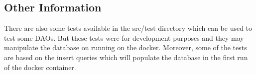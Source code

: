 \subsection{Other Information}


There are also some tests available in the src/test directory which can be used to test some DAOs.
But these tests were for development purposes and they may manipulate the database on running on the docker.
Moreover, some of the tests are based on the insert queries which will populate the database in the first run of the docker container.